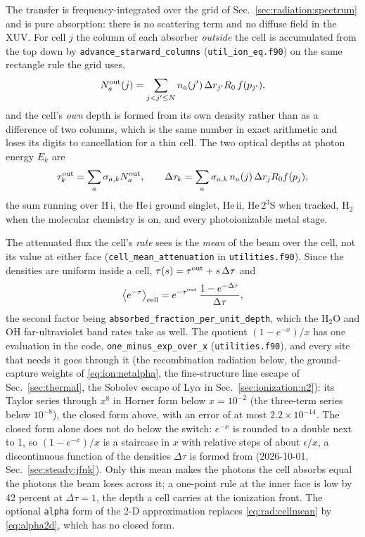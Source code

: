 The transfer is frequency-integrated over the grid of
Sec.~\ref{sec:radiation:spectrum} and is pure absorption: there is no
scattering term and no diffuse field in the XUV. For cell $j$ the column of
each absorber \emph{outside} the cell is accumulated from the top down by
\texttt{advance\_starward\_columns} (\texttt{util\_ion\_eq.f90}) on the same
rectangle rule the grid uses,
\begin{equation}
N_a^{\rm out}(j) = \sum_{j<j'\le N} n_a(j')\,\Delta r_{j'}R_0\,f(p_{j'}),
\label{eq:rad:column}
\end{equation}
and the cell's \emph{own} depth is formed from its own density rather than
as a difference of two columns, which is the same number in exact
arithmetic and loses its digits to cancellation for a thin cell. The two
optical depths at photon energy $E_k$ are
\begin{equation}
\tau^{\rm out}_k = \sum_a \sigma_{a,k}N^{\rm out}_a,
\qquad
\Delta\tau_k = \sum_a \sigma_{a,k}\,n_a(j)\,\Delta r_j R_0 f(p_j),
\label{eq:rad:tau}
\end{equation}
the sum running over H\,{\sc i}, the He\,{\sc i} ground singlet,
He\,{\sc ii}, He\,$2^3$S when tracked, H$_2$ when the molecular chemistry is
on, and every photoionizable metal stage.

The attenuated flux the cell's \emph{rate} sees is the \emph{mean} of the
beam over the cell, not its value at either face
(\texttt{cell\_mean\_attenuation} in \texttt{utilities.f90}). Since the
densities are uniform inside a cell, $\tau(s) = \tau^{\rm out}+s\,\Delta\tau$
and
\begin{equation}
\left\langle e^{-\tau}\right\rangle_{\rm cell}
 = e^{-\tau^{\rm out}}\,\frac{1-e^{-\Delta\tau}}{\Delta\tau},
\label{eq:rad:cellmean}
\end{equation}
the second factor being \texttt{absorbed\_fraction\_per\_unit\_depth}, which
the H$_2$O and OH far-ultraviolet band rates take as well. The quotient
$(1-e^{-x})/x$ has one evaluation in the code,
\texttt{one\_minus\_exp\_over\_x} (\texttt{utilities.f90}), and every site
that needs it goes through it (the recombination radiation below, the
ground-capture weights of \eqref{eq:ion:netalpha}, the fine-structure line
escape of Sec.~\ref{sec:thermal}, the Sobolev escape of Ly$\alpha$ in
Sec.~\ref{sec:ionization:n2}): its Taylor series through $x^{8}$ in Horner
form below $x = 10^{-2}$ (the three-term series below $10^{-8}$), the closed
form above, with an error of at most $2.2\times10^{-14}$. The closed form
alone does not do below the switch: $e^{-x}$ is rounded to a double next to 1,
so $(1-e^{-x})/x$ is a staircase in $x$ with relative steps of about
$\epsilon/x$, a discontinuous function of the densities $\Delta\tau$ is formed
from (2026-10-01, Sec.~\ref{sec:steady:jfnk}). Only this mean makes the photons the cell absorbs
equal the photons the beam loses across it; a one-point rule at the inner
face is low by 42 percent at $\Delta\tau=1$, the depth a cell carries at the
ionization front. The optional \texttt{alpha} form of the 2-D approximation replaces
\eqref{eq:rad:cellmean} by \eqref{eq:alpha2d}, which has no closed form.

